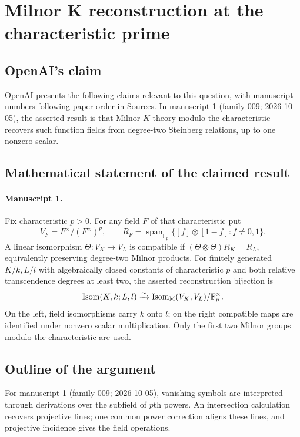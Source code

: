 \documentclass[11pt]{article}
\begin{document}
\section*{Milnor K reconstruction at the characteristic prime}

\subsection{OpenAI's claim}
OpenAI presents the following claims relevant to this question, with manuscript numbers following paper order in Sources. In manuscript 1 (family 009; 2026-10-05), the asserted result is that Milnor $K$-theory modulo the characteristic recovers such function fields from degree-two Steinberg relations, up to one nonzero scalar.

\subsection{Mathematical statement of the claimed result}
\paragraph{Manuscript 1.}
Fix characteristic $p>0$. For any field $F$ of that characteristic put
\[
 V_F=F^{\times}/(F^{\times})^p,\qquad
 R_F=\operatorname{span}_{\mathbb F_p}\{[f]\otimes[1-f]:f\ne0,1\}.
\]
A linear isomorphism $\Theta:V_K\to V_L$ is compatible if $(\Theta\otimes\Theta)R_K=R_L$, equivalently preserving degree-two Milnor products. For finitely generated $K/k,L/l$ with algebraically closed constants of characteristic $p$ and both relative transcendence degrees at least two, the asserted reconstruction bijection is
\[
 \operatorname{Isom}(K,k;L,l)\xrightarrow{\sim}
 \operatorname{Isom}_{\rm M}(V_K,V_L)/\mathbb F_p^{\times}.
\]
On the left, field isomorphisms carry $k$ onto $l$; on the right compatible maps are identified under nonzero scalar multiplication. Only the first two Milnor groups modulo the characteristic are used.

\subsection{Outline of the argument}
For manuscript 1 (family 009; 2026-10-05), vanishing symbols are interpreted through derivations over the subfield of $p$th powers. An intersection calculation recovers projective lines; one common power correction aligns these lines, and projective incidence gives the field operations.
\end{document}
